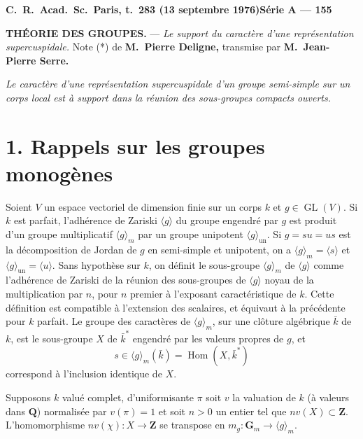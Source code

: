 \documentclass[10pt,a4paper]{amsart}
\theoremstyle{plain}
\theoremstyle{remark}
\DeclareMathOperator{\Hom}{Hom}
\DeclareMathOperator{\GL}{GL}
\begin{document}
\noindent\textbf{C.\ R.\ Acad.\ Sc.\ Paris, t.\ 283 (13 septembre 1976)\hfill Série A --- 155}

\vspace{2ex}

\begin{center}
\textbf{THÉORIE DES GROUPES.} --- \textit{Le support du caractère d'une représentation
supercuspidale.} Note (*) de \textbf{M.\ Pierre Deligne,} transmise par \textbf{M.\ Jean-Pierre Serre.}
\end{center}

\vspace{1ex}

\noindent\textit{Le caractère d'une représentation supercuspidale d'un groupe semi-simple
sur un corps local est à support dans la réunion des sous-groupes compacts ouverts.}

\section*{1. Rappels sur les groupes monogènes}

Soient $V$ un espace vectoriel de dimension finie sur un corps $k$ et $g \in \GL(V)$.
Si $k$ est parfait, l'adhérence de Zariski $\langle g \rangle$ du groupe engendré par $g$ est
produit d'un groupe multiplicatif $\langle g \rangle_m$ par un groupe unipotent $\langle g \rangle_{\mathrm{un}}$.
Si $g = su = us$ est la décomposition de Jordan de $g$ en semi-simple et unipotent,
on a $\langle g \rangle_m = \langle s \rangle$ et $\langle g \rangle_{\mathrm{un}} = \langle u \rangle$.
Sans hypothèse sur $k$, on définit le sous-groupe $\langle g \rangle_m$ de $\langle g \rangle$ comme
l'adhérence de Zariski de la réunion des sous-groupes de $\langle g \rangle$ noyau de la
multiplication par $n$, pour $n$ premier à l'exposant caractéristique de $k$. Cette définition
est compatible à l'extension des scalaires, et équivaut à la précédente pour $k$ parfait.
Le groupe des caractères de $\langle g \rangle_m$, sur une clôture algébrique $\bar{k}$ de $k$, est
le sous-groupe $X$ de $\bar{k}^*$ engendré par les valeurs propres de $g$, et
\[
s \in \langle g \rangle_m(\bar{k}) = \Hom(X, \bar{k}^*)
\]
correspond à l'inclusion identique de $X$.

Supposons $k$ valué complet, d'uniformisante $\pi$ soit $v$ la valuation de $k$ (à valeurs
dans $\mathbf{Q}$) normalisée par $v(\pi) = 1$ et soit $n > 0$ un entier tel que $nv(X) \subset \mathbf{Z}$.
L'homomorphisme $nv(\chi) : X \to \mathbf{Z}$ se transpose en $m_g : \mathbf{G}_m \to \langle g \rangle_m$.
\end{document}
